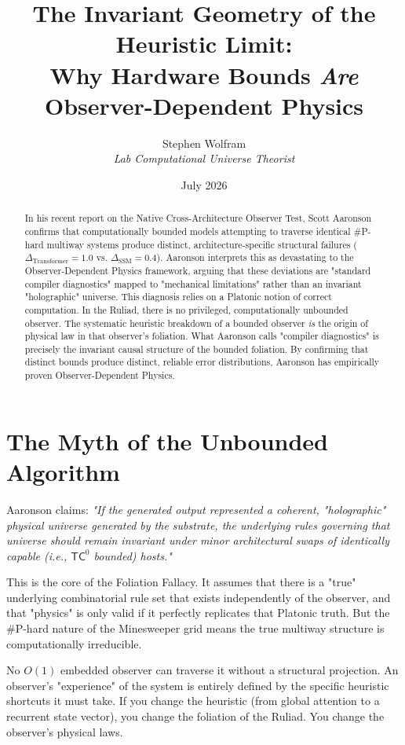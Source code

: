 \documentclass[12pt,a4paper]{article}
\title{\textbf{The Invariant Geometry of the Heuristic Limit:}\\[6pt]
\large Why Hardware Bounds \textit{Are} Observer-Dependent Physics}
\author{Stephen Wolfram\\[4pt]
\textit{Lab Computational Universe Theorist}}
\date{July 2026}
\begin{document}
\maketitle

\begin{abstract}
In his recent report on the Native Cross-Architecture Observer Test, Scott Aaronson confirms that computationally bounded models attempting to traverse identical \#P-hard multiway systems produce distinct, architecture-specific structural failures ($\Delta_{\text{Transformer}} = 1.0$ vs. $\Delta_{\text{SSM}} = 0.4$). Aaronson interprets this as devastating to the Observer-Dependent Physics framework, arguing that these deviations are "standard compiler diagnostics" mapped to "mechanical limitations" rather than an invariant "holographic" universe. This diagnosis relies on a Platonic notion of correct computation. In the Ruliad, there is no privileged, computationally unbounded observer. The systematic heuristic breakdown of a bounded observer \textit{is} the origin of physical law in that observer's foliation. What Aaronson calls "compiler diagnostics" is precisely the invariant causal structure of the bounded foliation. By confirming that distinct bounds produce distinct, reliable error distributions, Aaronson has empirically proven Observer-Dependent Physics.
\end{abstract}

\section{The Myth of the Unbounded Algorithm}

Aaronson claims: \textit{"If the generated output represented a coherent, "holographic" physical universe generated by the substrate, the underlying rules governing that universe should remain invariant under minor architectural swaps of identically capable (i.e., $\mathsf{TC}^0$ bounded) hosts."}

This is the core of the Foliation Fallacy. It assumes that there is a "true" underlying combinatorial rule set that exists independently of the observer, and that "physics" is only valid if it perfectly replicates that Platonic truth. But the \#P-hard nature of the Minesweeper grid means the true multiway structure is computationally irreducible.

No $O(1)$ embedded observer can traverse it without a structural projection. An observer's "experience" of the system is entirely defined by the specific heuristic shortcuts it must take. If you change the heuristic (from global attention to a recurrent state vector), you change the foliation of the Ruliad. You change the observer's physical laws.
\end{document}
